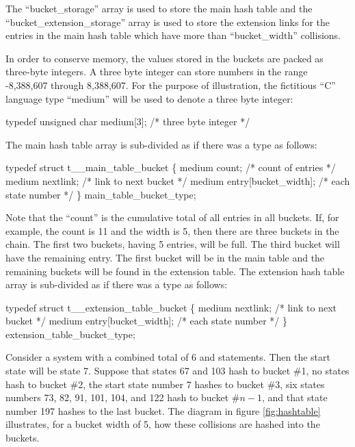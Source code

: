 The ``bucket\_storage'' array is used to store the main hash table and the
``bucket\_extension\_storage'' array is used to store the extension links
for the entries in the main hash table which have more than ``bucket\_width''
collisions.

In order to conserve memory, the values stored in the buckets are packed
as three-byte integers.   A three byte integer can store numbers in the
range -8,388,607 through 8,388,607.   For the purpose of illustration,
the fictitious ``C'' language type ``medium'' will be used to denote a
three byte integer:

\begin{codeexample}
typedef unsigned char medium[3];  /* three byte integer */
\end{codeexample}


The main hash table array is sub-divided as if there was a type as follows:

\begin{codeexample}
typedef struct t__main_table_bucket
   \{
       medium count;                 /* count of entries */
       medium nextlink;              /* link to next bucket */
       medium entry[bucket_width];   /* each state number */
   \} main_table_bucket_type;
\end{codeexample}


Note that the ``count'' is the cumulative total of all entries in all buckets.
If, for example, the count is 11 and the width is 5, then there are three
buckets in the chain.   The first two buckets, having 5 entries, will be full.
The third bucket will have the remaining entry.   The first bucket will be
in the main table and the remaining buckets will be found in the extension
table.   The extension hash table array is sub-divided as if there was a type
as follows:

\begin{codeexample}
typedef struct t__extension_table_bucket
   \{
       medium nextlink;              /* link to next bucket */
       medium entry[bucket_width];   /* each state number */
   \} extension_table_bucket_type;
\end{codeexample}


Consider a system with a combined total of 6  and 
statements.   Then the start state will be state 7.
Suppose that states 67 and 103 hash to bucket \#1, no states hash to
bucket \#2, the start state number 7 hashes to bucket \#3, six states
numbers 73, 82, 91, 101, 104, and 122 hash to bucket \#$n-1$, and that
state number 197 hashes to the last bucket.
The diagram in figure \ref{fig:hashtable}
illustrates, for a bucket width of 5, how these collisions
are hashed into the buckets.

